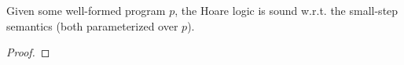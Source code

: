 \begin{lemma}
    Given some well-formed program $p$, the Hoare logic is sound w.r.t. the small-step semantics (both parameterized over $p$).
\end{lemma}
\begin{proof}
\end{proof}